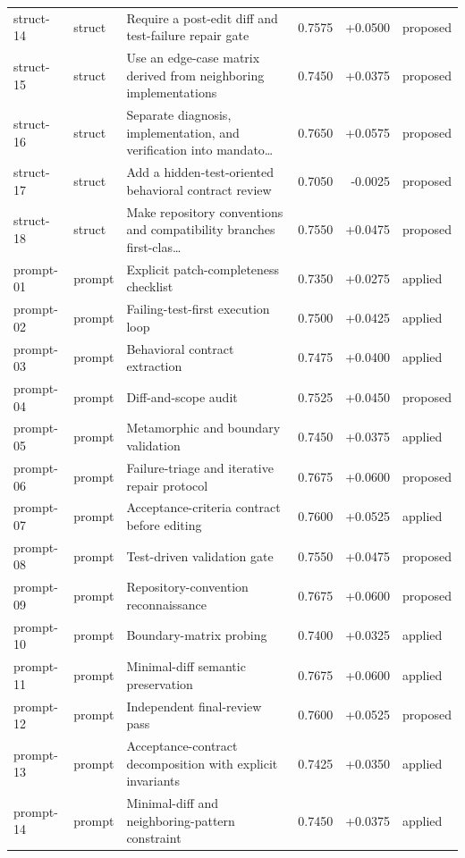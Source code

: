 \begin{center}
\begin{longtable}{llp{5.2cm}rrl}
struct-14 & struct & Require a post-edit diff and test-failure repair gate & 0.7575 & +0.0500 & proposed \\
struct-15 & struct & Use an edge-case matrix derived from neighboring implementations & 0.7450 & +0.0375 & proposed \\
struct-16 & struct & Separate diagnosis, implementation, and verification into mandato\ldots{} & 0.7650 & +0.0575 & proposed \\
struct-17 & struct & Add a hidden-test-oriented behavioral contract review & 0.7050 & -0.0025 & proposed \\
struct-18 & struct & Make repository conventions and compatibility branches first-clas\ldots{} & 0.7550 & +0.0475 & proposed \\
prompt-01 & prompt & Explicit patch-completeness checklist & 0.7350 & +0.0275 & applied \\
prompt-02 & prompt & Failing-test-first execution loop & 0.7500 & +0.0425 & applied \\
prompt-03 & prompt & Behavioral contract extraction & 0.7475 & +0.0400 & applied \\
prompt-04 & prompt & Diff-and-scope audit & 0.7525 & +0.0450 & proposed \\
prompt-05 & prompt & Metamorphic and boundary validation & 0.7450 & +0.0375 & applied \\
prompt-06 & prompt & Failure-triage and iterative repair protocol & 0.7675 & +0.0600 & proposed \\
prompt-07 & prompt & Acceptance-criteria contract before editing & 0.7600 & +0.0525 & applied \\
prompt-08 & prompt & Test-driven validation gate & 0.7550 & +0.0475 & proposed \\
prompt-09 & prompt & Repository-convention reconnaissance & 0.7675 & +0.0600 & proposed \\
prompt-10 & prompt & Boundary-matrix probing & 0.7400 & +0.0325 & applied \\
prompt-11 & prompt & Minimal-diff semantic preservation & 0.7675 & +0.0600 & applied \\
prompt-12 & prompt & Independent final-review pass & 0.7600 & +0.0525 & proposed \\
prompt-13 & prompt & Acceptance-contract decomposition with explicit invariants & 0.7425 & +0.0350 & applied \\
prompt-14 & prompt & Minimal-diff and neighboring-pattern constraint & 0.7450 & +0.0375 & applied \\

\end{longtable}
\end{center}

